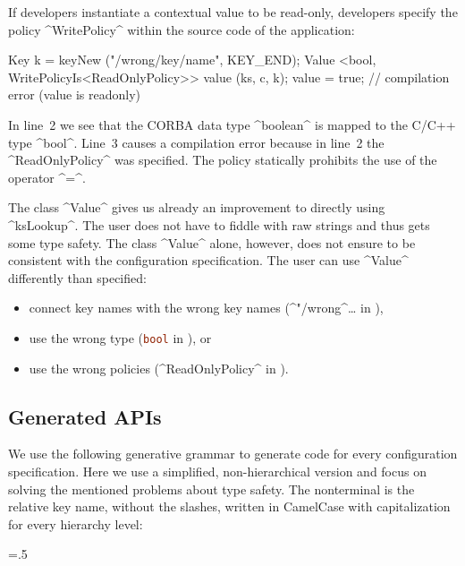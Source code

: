 \begin{example}
\label{ex:value-policy-readonly}
If developers instantiate a contextual value to be read-only, developers specify the policy ^WritePolicy^ within the source code of the application:

\begin{code}[language=Cpp]
Key k = keyNew ("/wrong/key/name", KEY_END);
Value <bool, WritePolicyIs<ReadOnlyPolicy>> value (ks, c, k);
value = true; // compilation error (value is readonly)
\end{code}

In line~2 we see that the CORBA data type ^boolean^ is mapped to the C/C++ type ^bool^.
Line~3 causes a compilation error because in line~2 the ^ReadOnlyPolicy^ was specified.
The policy statically prohibits the use of the operator ^=^.
\end{example}

The class ^Value^ gives us already an improvement to directly using ^ksLookup^.
The user does not have to fiddle with raw strings and thus gets some type safety.
The class ^Value^ alone, however, does not ensure to be consistent with the configuration specification.
The user can use ^Value^ differently than specified:
\begin{itemize}
\item connect key names with the wrong key names (^"/wrong^\dots{} in ),
\item use the wrong type (\lstinline[language=Cpp]^bool^ in ), or
\item use the wrong policies (^ReadOnlyPolicy^ in ).
\end{itemize}



\subsection{Generated APIs}
\label{sec:generated-apis}

We use the following generative grammar to generate code for every configuration specification.
Here we use a simplified, non-hierarchical version and focus on solving the mentioned problems about type safety.
The nonterminal  is the relative key name, without the slashes, written in CamelCase with capitalization for every hierarchy level:%
{\parfillskip=0pt \emergencystretch=.5\textwidth \par}


